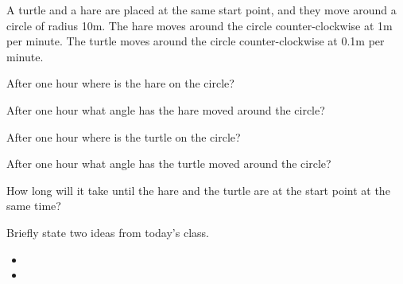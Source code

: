 \begin{problem}
\clearpage

\item A turtle and a hare are placed at the same start point, and they
  move around a circle of radius 10m. The hare moves around the circle
  counter-clockwise at 1m per minute. The turtle moves around the
  circle counter-clockwise at 0.1m per minute.
  \begin{subproblem}
  \item After one hour where is the hare on the circle?
    \vfill

  \item After one hour what angle has the hare moved around the circle?
    \vfill

  \item After one hour where is the turtle on the circle?
    \vfill

  \item After one hour what angle has the turtle moved around the circle?
    \vfill

  \item How long will it take until the hare and the turtle are at the
    start point at the same time?
    \vfill
  \end{subproblem}

\clearpage


\end{problem}

\postClass

\begin{problem}
\item Briefly state two ideas from today's class.
  \begin{itemize}
  \item
  \item
  \end{itemize}
\item
  \begin{subproblem}
    \item
  \end{subproblem}
\end{problem}


